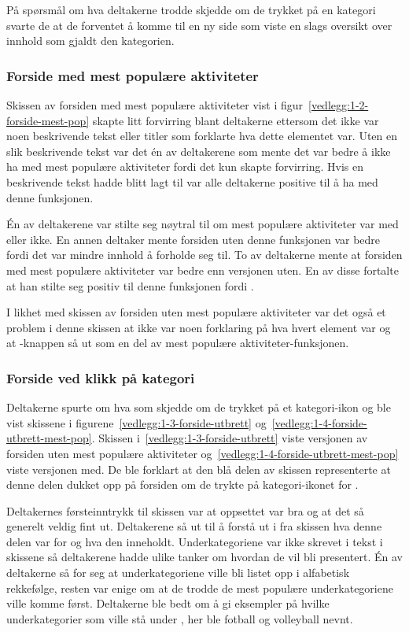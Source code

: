 På spørsmål om hva deltakerne trodde skjedde om de trykket på en kategori svarte de at de forventet å komme til en ny side som viste en slags oversikt over innhold som gjaldt den kategorien.

\subsubsection{Forside med mest populære aktiviteter}
Skissen av forsiden med mest populære aktiviteter vist i figur~\ref{vedlegg:1-2-forside-mest-pop} skapte litt forvirring blant deltakerne ettersom det ikke var noen beskrivende tekst eller titler som forklarte hva dette elementet var. Uten en slik beskrivende tekst var det én av deltakerene som mente det var bedre å ikke ha med mest populære aktiviteter fordi det kun skapte forvirring. Hvis en beskrivende tekst hadde blitt lagt til var alle deltakerne positive til å ha med denne funksjonen. 

Én av deltakerene var stilte seg nøytral til om mest populære aktiviteter var med eller ikke. En annen deltaker mente forsiden uten denne funksjonen var bedre fordi det var mindre innhold å forholde seg til. To av deltakerne mente at forsiden med mest populære aktiviteter var bedre enn versjonen uten. En av disse fortalte at han stilte seg positiv til denne funksjonen fordi .

I likhet med skissen av forsiden uten mest populære aktiviteter var det også et problem i denne skissen at ikke var noen forklaring på hva hvert element var og at -knappen så ut som en del av mest populære aktiviteter-funksjonen. 

\subsubsection{Forside ved klikk på kategori}
Deltakerne spurte om hva som skjedde om de trykket på et kategori-ikon og ble vist skissene i figurene~\ref{vedlegg:1-3-forside-utbrett} og~\ref{vedlegg:1-4-forside-utbrett-mest-pop}. Skissen i~\ref{vedlegg:1-3-forside-utbrett} viste versjonen av forsiden uten mest populære aktiviteter og~\ref{vedlegg:1-4-forside-utbrett-mest-pop} viste versjonen med. De ble forklart at den blå delen av skissen representerte at denne delen dukket opp på forsiden om de trykte på kategori-ikonet for .

Deltakernes førsteinntrykk til skissen var at oppsettet var bra og at det så generelt veldig fint ut. Deltakerene så ut til å forstå ut i fra skissen hva denne delen var for og hva den inneholdt. Underkategoriene var ikke skrevet i tekst i skissene så deltakerene hadde ulike tanker om hvordan de vil bli presentert. Én av deltakerne så for seg at underkategoriene ville bli listet opp i alfabetisk rekkefølge, resten var enige om at de trodde de mest populære underkategoriene ville komme først. Deltakerne ble bedt om å gi eksempler på hvilke underkategorier som ville stå under , her ble fotball og volleyball nevnt.

